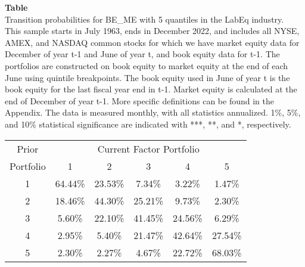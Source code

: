 \begin{table*}[ht!]
\raggedright
{}
\label{tab: transition_probs_BE_ME_LabEq_with_5_quantiles}
\textbf{Table \thetable} \\
Transition probabilities for BE_ME with 5 quantiles in the LabEq industry. \\
\hspace*{1em}This sample starts in July 1963, ends in December 2022, and includes all NYSE, AMEX, and NASDAQ common stocks for which we have market equity data for December of year t-1 and June of year t, and book equity data for t-1. The portfolios are constructed on book equity to market equity at the end of each June using quintile breakpoints.  The book equity used in June of year t is the book equity for the last fiscal year end in t-1.  Market equity is calculated at the end of December of year t-1.  More specific definitions can be found in the Appendix.  The data is measured monthly, with all statistics annualized.  1\%, 5\%, and 10\% statistical significance are indicated with ***, **, and *, respectively. \\
\vspace{0.5em}
\centering
\begin{adjustbox}{max width=\textwidth}
\begin{tabular}{@{}cccccc@{}}
\toprule
Prior & \multicolumn{5}{c}{Current Factor Portfolio} \\
Portfolio & 1 & 2 & 3 & 4 & 5 \\
\midrule
1 & 64.44\% & 23.53\% & 7.34\% & 3.22\% & 1.47\% \\
2 & 18.46\% & 44.30\% & 25.21\% & 9.73\% & 2.30\% \\
3 & 5.60\% & 22.10\% & 41.45\% & 24.56\% & 6.29\% \\
4 & 2.95\% & 5.40\% & 21.47\% & 42.64\% & 27.54\% \\
5 & 2.30\% & 2.27\% & 4.67\% & 22.72\% & 68.03\% \\
\bottomrule
\end{tabular}
\end{adjustbox}
\end{table*}